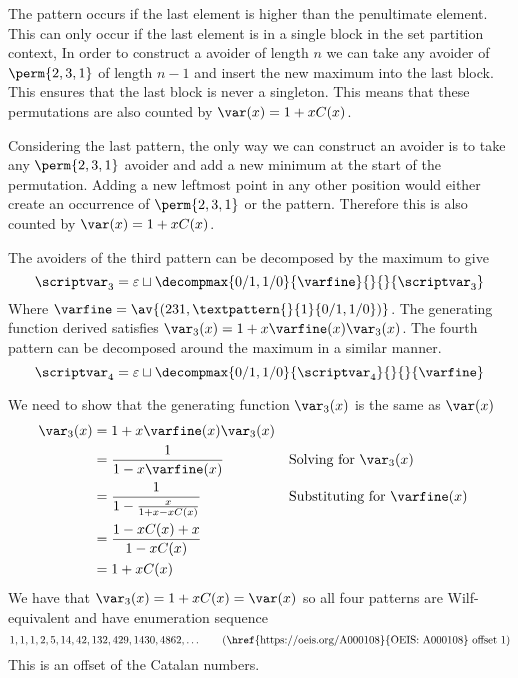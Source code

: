 The pattern  occurs if
the last element is higher than the penultimate element. This can only occur
if the last element is in a single block in the set partition context, In order
to construct a avoider of length \(n\) we can take any avoider of
\(\perm{2,3,1}\) of length \(n-1\) and insert the new maximum into the last
block.  This ensures that the last block is never a singleton. This means
that these permutations are also counted by \(\var(x) = 1+xC(x)\).

Considering the last pattern, the only way we can construct an
avoider is to take any \(\perm{2,3,1}\) avoider and add a new minimum
at the start of the permutation. Adding a new leftmost point in any other
position would either create an occurrence of \(\perm{2,3,1}\) or the pattern.
Therefore this is also counted by \(\var(x) = 1+xC(x)\).

The avoiders of the third pattern can be decomposed by the maximum
to give
\begin{equation*}
    \scriptvar_3 = \varepsilon \sqcup
    \decompmax{0/1,1/0}{\mathcal{\varfine}}{}{}{\scriptvar_3}
\end{equation*}
Where \(\mathcal{\varfine} = \av{(231,\textpattern{}{1}{0/1,1/0})}\).
The generating function derived satisfies \(\var_3(x) = 1 + x\varfine(x)\var_3(x)\).
The fourth pattern can be decomposed around the maximum in a similar
manner.
\begin{equation*}
    \scriptvar_4 = \varepsilon \sqcup
    \decompmax{0/1,1/0}{\scriptvar_4}{}{}{\mathcal{\varfine}}
\end{equation*}

We need to show that the generating function \(\var_3(x)\) is the same as \(\var(x)\)
\begin{equation*}
    \begin{aligned}
        \var_3(x) &= 1 + x\varfine(x)\var_3(x) \\
        &= \frac{1}{1-x\varfine(x)} && \text{Solving for \(\var_3(x)\)}\\
        &= \frac{1}{1 - \frac{x}{1+x-xC(x)}} &&\text{Substituting for \(\varfine(x)\)}\\
        &= \frac{1-xC(x) +x}{1-xC(x)}\\
        &= 1+xC(x)
    \end{aligned}
\end{equation*}
We have that \(\var_3(x) = 1+xC(x)= \var(x) \) so all four patterns are Wilf-equivalent
 and have enumeration sequence
 \begin{equation*}
     1, 1, 1, 2, 5, 14, 42, 132, 429, 1430, 4862,\dotsc \tag{\href{https://oeis.org/A000108}{OEIS: A000108} offset 1}
 \end{equation*}
 This is an offset of the Catalan numbers.

